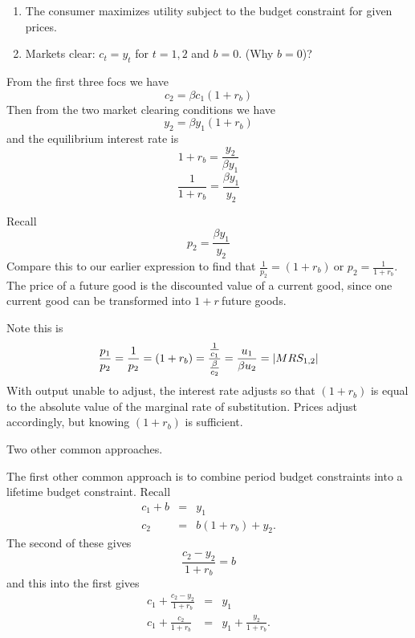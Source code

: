 \documentclass{sebase}
\begin{document}
\begin{enumerate}
\item The consumer maximizes utility subject to the budget constraint for
given prices.

\item Markets clear: $c_{t}=y_{t}$ for $t=1,2$ and $b=0$. (Why $b=0$)?
\end{enumerate}

From the first three focs we have%
\begin{equation*}
c_{2}=\beta c_{1}\left( 1+r_{b}\right)
\end{equation*}%
Then from the two market clearing conditions we have%
\begin{equation*}
y_{2}=\beta y_{1}\left( 1+r_{b}\right)
\end{equation*}%
and the equilibrium interest rate is%
\begin{equation*}
1+r_{b}=\frac{y_{2}}{\beta y_{1}}
\end{equation*}%
\begin{equation*}
\frac{1}{1+r_{b}}=\frac{\beta y_{1}}{y_{2}}
\end{equation*}%
\pagebreak

Recall%
\begin{equation*}
p_{2}=\frac{\beta y_{1}}{y_{2}}
\end{equation*}%
Compare this to our earlier expression to find that $\frac{1}{p_{2}}=\left(
1+r_{b}\right) \ $or $p_{2}=\frac{1}{1+r_{b}}.$ The price of a future good
is the discounted value of a current good, since one current good can be
transformed into $1+r\ $future goods.

Note this is 
\begin{equation*}
\frac{p_{1}}{p_{2}}=\frac{1}{p_{2}}=\left( 1+r_{b}\right) =\frac{\frac{1}{%
c_{1}}}{\frac{\beta }{c_{2}}}=\frac{u_{1}}{\beta u_{2}}=\left\vert
MRS_{1,2}\right\vert
\end{equation*}%
With output unable to adjust, the interest rate adjusts so that $\left(
1+r_{b}\right) $ is equal to the absolute value of the marginal rate of
substitution. Prices adjust accordingly, but knowing $(1+r_{b})$ is
sufficient. \pagebreak

Two other common approaches.

The first other common approach is to combine period budget constraints into
a lifetime budget constraint. Recall 
\begin{eqnarray*}
c_{1}+b &=&y_{1} \\
c_{2} &=&b\left( 1+r_{b}\right) +y_{2}.
\end{eqnarray*}%
The second of these gives 
\begin{equation*}
\frac{c_{2}-y_{2}}{1+r_{b}}=b
\end{equation*}%
and this into the first gives%
\begin{eqnarray*}
c_{1}+\frac{c_{2}-y_{2}}{1+r_{b}} &=&y_{1} \\
c_{1}+\frac{c_{2}}{1+r_{b}} &=&y_{1}+\frac{y_{2}}{1+r_{b}}.
\end{eqnarray*}%
\pagebreak
\end{document}
